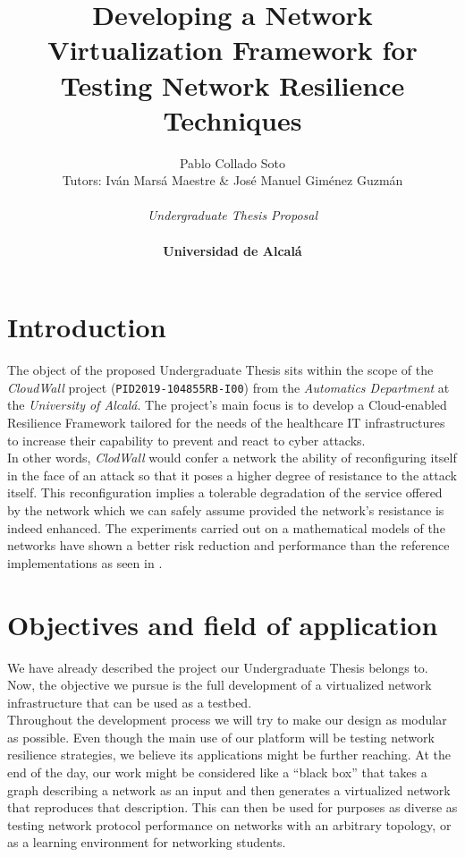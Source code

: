 \documentclass[12pt]{article}
\title{\vspace{-1cm}Developing a Network Virtualization Framework for Testing Network Resilience Techniques}
\author{Pablo Collado Soto \\ Tutors: Iván Marsá Maestre \& José Manuel Giménez Guzmán \\ \\ \textit{Undergraduate Thesis Proposal} \\ \\ \textbf{Universidad de Alcalá}}
\date{}
\begin{document}
    \maketitle

    \section{Introduction}
        The object of the proposed Undergraduate Thesis sits within the scope of the \textit{CloudWall} project (\texttt{PID2019-104855RB-I00}) from the \textit{Automatics Department} at the \textit{University of Alcalá}. The project's main focus is to develop a Cloud-enabled Resilience Framework
        tailored for the needs of the healthcare IT infrastructures to increase their capability to prevent and react to cyber attacks.\\

        In other words, \textit{ClodWall} would confer a network the ability of reconfiguring itself in the face of an attack so that it poses a higher degree of resistance to the attack itself. This reconfiguration implies a tolerable degradation of the service offered by the network which we can safely assume provided the network's resistance is indeed enhanced. The experiments carried out on a mathematical models of the networks have shown a better risk reduction and performance than the reference implementations as seen in \cite{bib:REACT}.\\

    \section{Objectives and field of application}
        We have already described the project our Undergraduate Thesis belongs to. Now, the objective we pursue is the full development of a virtualized network infrastructure that can be used as a testbed.\\

        Throughout the development process we will try to make our design as modular as possible. Even though the main use of our platform will be testing network resilience strategies, we believe its applications might be further reaching. At the end of the day, our work might be considered like a ``black box'' that takes a graph describing a network as an input and then generates a virtualized network that reproduces that description. This can then be used for purposes as diverse as testing network protocol performance on networks with an arbitrary topology, or as a learning environment for networking students.\\
\end{document}
